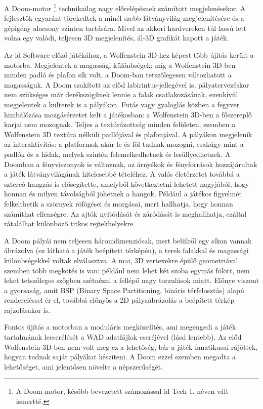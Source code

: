 \documentclass{thesis-ekf}
\theoremstyle{definition}
\theoremstyle{remark}
\begin{document}
A Doom-motor \footnote{A Doom-motor, később bevezetett számozással id Tech 1.
néven vált ismertté.} technikailag nagy előrelépésnek számított megjelenésekor.
A fejlesztők egyaránt törekedtek a minél szebb látványvilág megjelenítésére és a
gépigény alacsony szinten tartására. Mivel az akkori hardvereken túl lassú lett
volna egy valódi, teljesen 3D megjelenítés, ál-3D grafikát kapott a játék.

Az id Software előző játékához, a Wolfenstein 3D-hez képest több újítás került a
motorba. Megjelentek a magassági különbségek: míg a Wolfenstein 3D-ben minden
padló és plafon sík volt, a Doom-ban tetszőlegesen változhatott a magasságuk. A
Doom szakított az előd labirintus-jellegével is, pályatervezéskor nem szükséges
már derékszögűnek lennie a falak csatlakozásának, ezenkívül megjelentek a
külterek is a pályákon. Futás vagy gyaloglás közben a fegyver himbálózása
mozgásérzetet kelt a játékosban: a Wolfenstein 3D-ben a főszereplő karjai nem
mozognak. Teljes a textúrázottság minden felületen, szemben a Wolfenstein 3D
textúra nélküli padlójával és plafonjával. A pályákon megjelenik az
interaktivitás: a platformok akár le és föl tudnak mozogni, csakúgy mint a
padlók és a hidak, melyek szintén felemelkedhetnek és lesüllyedhetnek. A Doomban
a fényviszonyok is változnak, az árnyékok és fényforrások hozzájárultak a játék
látványvilágának hitelesebbé tételéhez. A valós életérzetet továbbá a sztereó
hangzás is elősegítette, amelyből következtetni lehetett nagyjából, hogy honnan
és milyen távolságból jöhetnek a hangok. Például a játékos figyelmét
felkelthetik a szörnyek röfögései és morgásai, mert hallhatja, hogy honnan
számíthat ellenségre. Az ajtók nyitódását és záródását is meghallhatja, ezáltal
rátalálhat különböző titkos rejtekhelyekre.

A Doom pályái nem teljesen háromdimenziósak, mert belülről egy síkon vannak
ábrázolva (ez látható a játék beépített térképén), a terek falakkal és
magassági különbségekkel voltak elválasztva. A mai, 3D vertexekre épülő
geometriával szemben több megkötés is van: például nem lehet két szoba egymás
fölött, nem lehet tetszőleges szögben szétnézni a fellépő nagy torzulások miatt.
Előnye viszont a gyorsaság, amit BSP (Binary Space Partitioning, bináris
térfelosztás) alapú rendereléssel ér el, továbbá előnyös a 2D pályaábrázolás a
beépített térkép rajzolásakor is.

Fontos újítás a motorban a moduláris megközelítés, ami megengedi a játék
tartalmának lecserélését a WAD adatfájlok cseréjével (lásd lentebb). Az előd
Wolfenstein 3D-ben nem volt meg ez a lehetőség, bár a játék fanatikusai
rájöttek, hogyan tudnak saját pályákat készíteni. A Doom ezzel szemben megadta a
lehetőséget, ami jelentősen növelte a népszerűségét.
\end{document}
